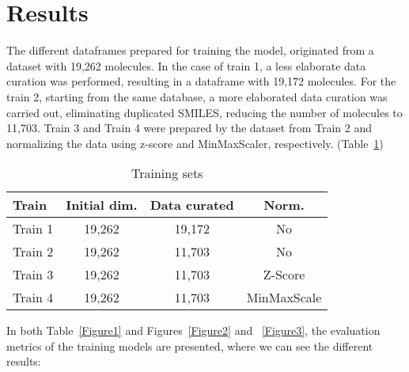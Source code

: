 \documentclass[final,times,twocolumn,article]{elsarticle}
\begin{document}
\section{Results}

The different dataframes prepared for training the model, originated from a dataset with 19,262 molecules. In the case of train 1, a less elaborate data curation was performed, resulting in a dataframe with 19,172 molecules. For the train 2, starting from the same database, a more elaborated data curation was carried out, eliminating duplicated SMILES, reducing the number of molecules to 11,703. Train 3 and Train 4 were prepared by the dataset from Train 2 and normalizing the data using z-score and MinMaxScaler, respectively. (Table~\ref{Table1})

\begin{table}[ht]
\centering
\begin{tabular}{l c c c} 
     \hline
     Train & Initial dim. & Data curated & Norm.\\ 
     \hline
     Train 1 & 19,262 & 19,172 & No\\
     \hline
     Train 2 & 19,262 & 11,703 & No \\
     \hline
     Train 3 & 19,262 & 11,703 & Z-Score\\ 
     \hline
     Train 4 & 19,262 & 11,703 & MinMaxScale\\ 
     \hline
    \end{tabular}
\caption{Training sets}
\label{Table1}
\end{table}

In both Table~\ref{Figure1} and Figures~\ref{Figure2} and ~\ref{Figure3}, the evaluation metrics of the training models are presented, where we can see the different results: 
\end{document}
